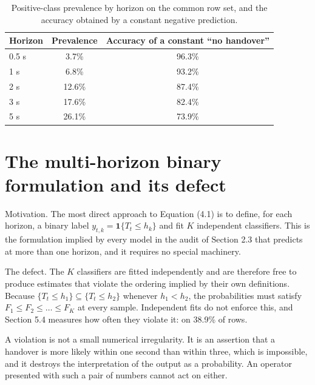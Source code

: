 \begin{table}[htbp]
\centering
\caption{Positive-class prevalence by horizon on the common row set, and the accuracy obtained by a constant negative prediction.}
\label{tab:4_1}
\vspace{0.4em}
\singlespacing
\small
\begin{tabularx}{\linewidth}{X c c}
\toprule
\textbf{Horizon} & \textbf{Prevalence} & \textbf{Accuracy of a constant ``no handover''} \\
\midrule
0.5 s & 3.7\% & 96.3\% \\
1 s & 6.8\% & 93.2\% \\
2 s & 12.6\% & 87.4\% \\
3 s & 17.6\% & 82.4\% \\
5 s & 26.1\% & 73.9\% \\
\bottomrule
\end{tabularx}
\end{table}


\section{The multi-horizon binary formulation and its defect}
\label{sec:4_2}

Motivation. The most direct approach to Equation (4.1) is to define, for each horizon, a binary label $y_{t,k} = \mathbf{1}\{T_t \le h_k\}$ and fit $K$ independent classifiers. This is the formulation implied by every model in the audit of Section 2.3 that predicts at more than one horizon, and it requires no special machinery.

The defect. The $K$ classifiers are fitted independently and are therefore free to produce estimates that violate the ordering implied by their own definitions. Because $\{T_t \le h_1\} \subseteq \{T_t \le h_2\}$ whenever $h_1 < h_2$, the probabilities must satisfy $F_1 \le F_2 \le \dots \le F_K$ at every sample. Independent fits do not enforce this, and Section 5.4 measures how often they violate it: on 38.9\% of rows.

A violation is not a small numerical irregularity. It is an assertion that a handover is more likely within one second than within three, which is impossible, and it destroys the interpretation of the output as a probability. An operator presented with such a pair of numbers cannot act on either.

